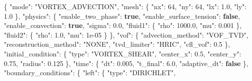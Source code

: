 \documentclass[
  10pt,
]{article}
\newenvironment{Shaded}{}{}
\newcommand{\DataTypeTok}[1]{\textcolor[rgb]{0.56,0.13,0.00}{#1}}
\newcommand{\DecValTok}[1]{\textcolor[rgb]{0.25,0.63,0.44}{#1}}
\newcommand{\FloatTok}[1]{\textcolor[rgb]{0.25,0.63,0.44}{#1}}
\newcommand{\FunctionTok}[1]{\textcolor[rgb]{0.02,0.16,0.49}{#1}}
\newcommand{\KeywordTok}[1]{\textcolor[rgb]{0.00,0.44,0.13}{\textbf{#1}}}
\newcommand{\StringTok}[1]{\textcolor[rgb]{0.25,0.44,0.63}{#1}}
\begin{document}
\begin{Shaded}
\begin{Highlighting}[]
\FunctionTok{\{}
  \DataTypeTok{"mode"}\FunctionTok{:} \StringTok{"VORTEX\_ADVECTION"}\FunctionTok{,}
  \DataTypeTok{"mesh"}\FunctionTok{:} \FunctionTok{\{}
    \DataTypeTok{"nx"}\FunctionTok{:} \DecValTok{64}\FunctionTok{,}
    \DataTypeTok{"ny"}\FunctionTok{:} \DecValTok{64}\FunctionTok{,}
    \DataTypeTok{"lx"}\FunctionTok{:} \FloatTok{1.0}\FunctionTok{,}
    \DataTypeTok{"ly"}\FunctionTok{:} \FloatTok{1.0}
  \FunctionTok{\},}
  \DataTypeTok{"physics"}\FunctionTok{:} \FunctionTok{\{}
    \DataTypeTok{"enable\_two\_phase"}\FunctionTok{:} \KeywordTok{true}\FunctionTok{,}
    \DataTypeTok{"enable\_surface\_tension"}\FunctionTok{:} \KeywordTok{false}\FunctionTok{,}
    \DataTypeTok{"enable\_convection"}\FunctionTok{:} \KeywordTok{true}\FunctionTok{,}
    \DataTypeTok{"sigma"}\FunctionTok{:} \FloatTok{0.0}\FunctionTok{,}
    \DataTypeTok{"fluid1"}\FunctionTok{:} \FunctionTok{\{}
      \DataTypeTok{"rho"}\FunctionTok{:} \FloatTok{1000.0}\FunctionTok{,}
      \DataTypeTok{"mu"}\FunctionTok{:} \FloatTok{0.001}
    \FunctionTok{\},}
    \DataTypeTok{"fluid2"}\FunctionTok{:} \FunctionTok{\{}
      \DataTypeTok{"rho"}\FunctionTok{:} \FloatTok{1.0}\FunctionTok{,}
      \DataTypeTok{"mu"}\FunctionTok{:} \DecValTok{1e{-}05}
    \FunctionTok{\}}
  \FunctionTok{\},}
  \DataTypeTok{"vof"}\FunctionTok{:} \FunctionTok{\{}
    \DataTypeTok{"advection\_method"}\FunctionTok{:} \StringTok{"VOF\_TVD"}\FunctionTok{,}
    \DataTypeTok{"reconstruction\_method"}\FunctionTok{:} \StringTok{"NONE"}\FunctionTok{,}
    \DataTypeTok{"tvd\_limiter"}\FunctionTok{:} \StringTok{"HRIC"}\FunctionTok{,}
    \DataTypeTok{"cfl\_vof"}\FunctionTok{:} \FloatTok{0.5}
  \FunctionTok{\},}
  \DataTypeTok{"initial\_condition"}\FunctionTok{:} \FunctionTok{\{}
    \DataTypeTok{"type"}\FunctionTok{:} \StringTok{"VORTEX\_SHEAR"}\FunctionTok{,}
    \DataTypeTok{"center\_x"}\FunctionTok{:} \FloatTok{0.5}\FunctionTok{,}
    \DataTypeTok{"center\_y"}\FunctionTok{:} \FloatTok{0.75}\FunctionTok{,}
    \DataTypeTok{"radius"}\FunctionTok{:} \FloatTok{0.125}
  \FunctionTok{\},}
  \DataTypeTok{"time"}\FunctionTok{:} \FunctionTok{\{}
    \DataTypeTok{"dt"}\FunctionTok{:} \FloatTok{0.005}\FunctionTok{,}
    \DataTypeTok{"t\_final"}\FunctionTok{:} \FloatTok{6.0}\FunctionTok{,}
    \DataTypeTok{"adaptive\_dt"}\FunctionTok{:} \KeywordTok{false}
  \FunctionTok{\},}
  \DataTypeTok{"boundary\_conditions"}\FunctionTok{:} \FunctionTok{\{}
    \DataTypeTok{"left"}\FunctionTok{:} \FunctionTok{\{}
      \DataTypeTok{"type"}\FunctionTok{:} \StringTok{"DIRICHLET"}\FunctionTok{,}

\end{Highlighting}
\end{Shaded}
\end{document}
